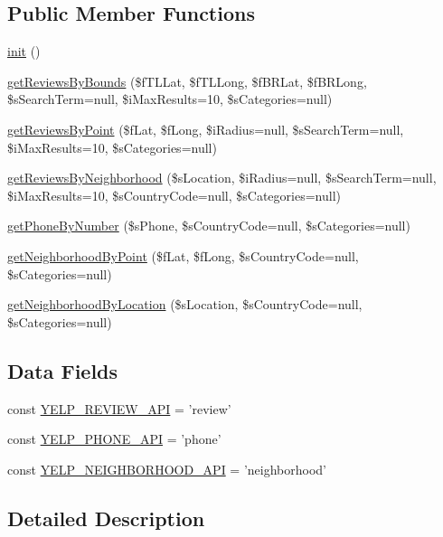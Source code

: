 \subsection*{Public Member Functions}
\begin{DoxyCompactItemize}
\item 
\hyperlink{classCPSYelpApi_a4be4055f3361d4800e16bc2e2e38cda6}{init} ()
\item 
\hyperlink{classCPSYelpApi_abbc7cfd6f653a4f824454111b1b4bd83}{getReviewsByBounds} (\$fTLLat, \$fTLLong, \$fBRLat, \$fBRLong, \$sSearchTerm=null, \$iMaxResults=10, \$sCategories=null)
\item 
\hyperlink{classCPSYelpApi_a3231452e69758a94b0b659d1598b84f0}{getReviewsByPoint} (\$fLat, \$fLong, \$iRadius=null, \$sSearchTerm=null, \$iMaxResults=10, \$sCategories=null)
\item 
\hyperlink{classCPSYelpApi_a5de03f812e5cbf44675d49536cd65a9e}{getReviewsByNeighborhood} (\$sLocation, \$iRadius=null, \$sSearchTerm=null, \$iMaxResults=10, \$sCountryCode=null, \$sCategories=null)
\item 
\hyperlink{classCPSYelpApi_a69f527b0718ffd791c4e7fb7146d9c1a}{getPhoneByNumber} (\$sPhone, \$sCountryCode=null, \$sCategories=null)
\item 
\hyperlink{classCPSYelpApi_abac78cf39007878c6ec3eaed9c2b9961}{getNeighborhoodByPoint} (\$fLat, \$fLong, \$sCountryCode=null, \$sCategories=null)
\item 
\hyperlink{classCPSYelpApi_a658f708430f9aaa6dfcc13fabdb4adc3}{getNeighborhoodByLocation} (\$sLocation, \$sCountryCode=null, \$sCategories=null)
\end{DoxyCompactItemize}
\subsection*{Data Fields}
\begin{DoxyCompactItemize}
\item 
const \hyperlink{classCPSYelpApi_a9b561bcfa096fa859d70ff6e96b51b19}{YELP\_\-REVIEW\_\-API} = 'review'
\item 
const \hyperlink{classCPSYelpApi_a8123f4b6b144f8a3eb0d4ed3b6fb2128}{YELP\_\-PHONE\_\-API} = 'phone'
\item 
const \hyperlink{classCPSYelpApi_ada9a084b29490d7ad96bc435526966e5}{YELP\_\-NEIGHBORHOOD\_\-API} = 'neighborhood'
\end{DoxyCompactItemize}


\subsection{Detailed Description}


